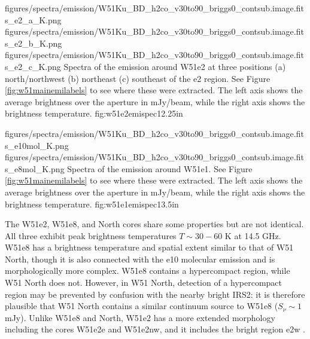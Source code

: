 \FigureThreeAA
{figures/spectra/emission/W51Ku_BD_h2co_v30to90_briggs0_contsub.image.fits_e2_a_K.png}
{figures/spectra/emission/W51Ku_BD_h2co_v30to90_briggs0_contsub.image.fits_e2_b_K.png}
{figures/spectra/emission/W51Ku_BD_h2co_v30to90_briggs0_contsub.image.fits_e2_c_K.png}
{Spectra of the \twotwo emission around W51e2 at three positions (a)
north/northwest (b) northeast (c) southeast of the e2 \hchii region.  See Figure
\ref{fig:w51mainemilabels} to see where these were extracted.  The left axis
shows the average brightness over the aperture in mJy/beam, while the right axis
shows the brightness temperature.}
{fig:w51e2emispec}{1}{2.25in}

\FigureTwoAA
{figures/spectra/emission/W51Ku_BD_h2co_v30to90_briggs0_contsub.image.fits_e10mol_K.png}
{figures/spectra/emission/W51Ku_BD_h2co_v30to90_briggs0_contsub.image.fits_e8mol_K.png}
{Spectra of the \twotwo emission around W51e1.  See Figure
\ref{fig:w51mainemilabels} to see where these were extracted.  The left axis
shows the average brightness over the aperture in mJy/beam, while the right axis
shows the brightness temperature.
}
{fig:w51e1emispec}{1}{3.5in}



The W51e2, W51e8, and North cores share some properties but are not identical.
All three exhibit peak \formaldehyde \twotwo brightness temperatures
$T\sim30-60$ K at 14.5 GHz.  W51e8 has a
brightness temperature and spatial extent similar to that of W51 North, though
it is also connected with the e10 molecular emission and is morphologically
more complex.  W51e8 contains a hypercompact \hii region, while W51 North does
not.  However, in W51 North, detection of a hypercompact \hii region may be prevented by
confusion with the nearby bright IRS2: it is therefore plausible that
W51 North contains a similar continuum source to W51e8 ($S_\nu \sim 1$ mJy).
Unlike W51e8 and North, W51e2 has a more extended morphology including
the cores W51e2e and W51e2nw, and it includes the bright \hchii region e2w
\citep{Shi2010a,Goddi2016a}.

